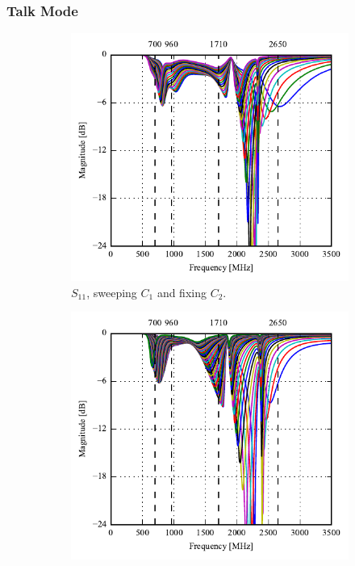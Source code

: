\FloatBarrier
\subsubsection{Talk Mode}

\begin{figure}[htbp]
   \begin{subfigure}[b]{0.49\linewidth}
        \centering
        \includegraphics{img/tech_sol/monopole/highband/ue/talkmode/s11.pdf}
        \caption{$S_{11}$, sweeping $C_1$ and fixing $C_2$.}
    \end{subfigure}
    \hfill
    \begin{subfigure}[b]{0.49\linewidth}
        \centering
        \includegraphics{img/tech_sol/monopole/highband/ue/talkmode/s22.pdf}

\end{subfigure}
\end{figure}
